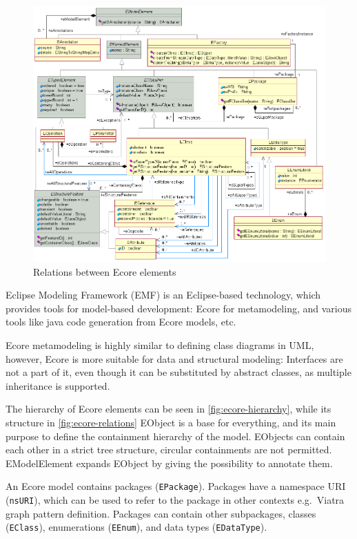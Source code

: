 \begin{figure}
	\begin{center}
		\includegraphics[width=\textwidth]{figures/EcoreRelations.png}
		\caption{Relations between Ecore elements \cite{ecore-package} }
		\label{fig:ecore-relations}
	\end{center}
\end{figure}

Eclipse Modeling Framework (EMF) is an Eclipse-based technology, which provides tools for model-based development: 
Ecore \cite{ecore-package} for metamodeling, and various tools like java code generation from Ecore models, etc.

Ecore metamodeling is highly similar to defining class diagrams in UML, however, 
Ecore is more suitable for data and structural modeling: Interfaces are not a part of it, even though it can be substituted by abstract classes, as multiple inheritance is supported.

The hierarchy of Ecore elements can be seen in \autoref{fig:ecore-hierarchy}, while its structure in \autoref{fig:ecore-relations}
EObject is a base for everything, and its main purpose to define the containment hierarchy of the model. 
EObjects can contain each other in a strict tree structure, circular containments are not permitted.
EModelElement expands EObject by giving the possibility to annotate them.

An Ecore model contains packages (\texttt{EPackage}). 
Packages have a namespace URI (\texttt{nsURI}), which can be used to refer to the package in other contexts e.g.\ Viatra graph pattern definition.
Packages can contain other subpackages, classes (\texttt{EClass}), enumerations (\texttt{EEnum}), and data types (\texttt{EDataType}).

